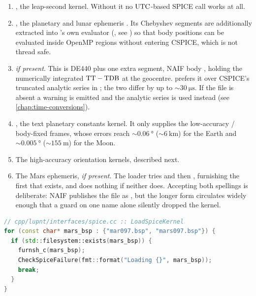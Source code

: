 \begin{enumerate}[leftmargin=1.6em]
  \item {}, the leap-second kernel. Without it no
    $\mathrm{UTC}$-based SPICE call works at all.
  \item {}, the planetary and lunar ephemeris
    \citep{park2021de440}. Its Chebyshev segments are additionally extracted
    into \lupnt{}'s own evaluator (, see
    ) so that body positions can be
    evaluated inside OpenMP regions without entering CSPICE, which is not
    thread safe.
  \item {} \emph{if present}. This is DE440 plus one extra
    segment, NAIF body , holding the numerically integrated
    $\mathrm{TT}-\mathrm{TDB}$ at the geocentre. \lupnt{} prefers it over CSPICE's truncated
    analytic series in ; the two differ by up to
    ${\sim}\SI{30}{\micro\second}$. If the file is absent a warning is emitted
    and the analytic series is used instead (see \cref{chap:time-conversions}).
  \item {}, the text planetary constants kernel. It only
    supplies the low-accuracy / body-fixed
    frames, whose errors reach ${\sim}\SI{0.06}{\degree}$
    (${\sim}\SI{6}{\kilo\meter}$) for the Earth and ${\sim}\SI{0.005}{\degree}$
    (${\sim}\SI{155}{\meter}$) for the Moon.
  \item The high-accuracy orientation kernels, described next.
  \item The Mars ephemeris, \emph{if present}. The loader tries
     and then , furnishing the first that
    exists, and does nothing if neither does. Accepting both spellings is
    deliberate: NAIF publishes the file as , but the longer
    form circulates widely enough that a guard on one name alone silently
    dropped the kernel.
\end{enumerate}

\begin{lstlisting}[language=cpp, caption={Furnishing the Mars ephemeris under either spelling.}, label={lst:sp3-mars}]
// cpp/lupnt/interfaces/spice.cc :: LoadSpiceKernel
for (const char* mars_bsp : {"mar097.bsp", "mars097.bsp"}) {
  if (std::filesystem::exists(mars_bsp)) {
    furnsh_c(mars_bsp);
    CheckSpiceFailure(fmt::format("Loading {}", mars_bsp));
    break;
  }
}
\end{lstlisting}

